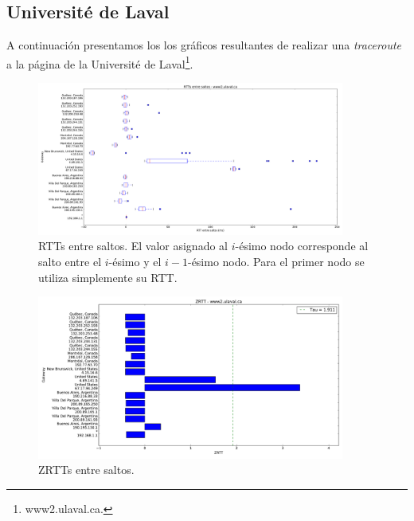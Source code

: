 \subsection{Université de Laval}

A continuación presentamos los los gráficos resultantes de realizar una \textit{traceroute} a la página de la Université de Laval\footnote{www2.ulaval.ca.}.

\begin{figure}
    \centering
    \includegraphics[width=0.9\textwidth]{img/grafico1-www2-ulaval-ca.pdf}
    \caption{RTTs entre saltos. El valor asignado al $i$-ésimo nodo corresponde al salto entre el $i$-ésimo y el $i - 1$-ésimo nodo. Para el primer nodo se utiliza simplemente su RTT.}
\end{figure}

\begin{figure}
    \centering
    \includegraphics[width=0.9\textwidth]{img/grafico2-www2-ulaval-ca.pdf}
    \caption{ZRTTs entre saltos.}
\end{figure}

